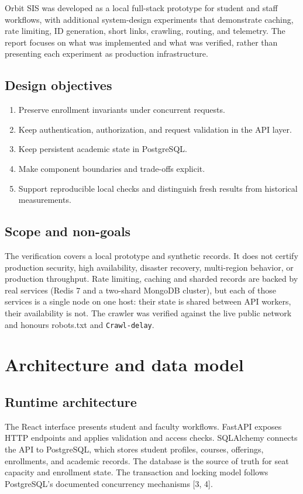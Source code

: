 \documentclass[11pt,a4paper,oneside]{report}
\begin{document}
Orbit SIS was developed as a local full-stack prototype for student and staff workflows, with additional system-design experiments that demonstrate caching, rate limiting, ID generation, short links, crawling, routing, and telemetry. The report focuses on what was implemented and what was verified, rather than presenting each experiment as production infrastructure.

\section{Design objectives}
\begin{enumerate}
\item Preserve enrollment invariants under concurrent requests.
\item Keep authentication, authorization, and request validation in the API layer.
\item Keep persistent academic state in PostgreSQL.
\item Make component boundaries and trade-offs explicit.
\item Support reproducible local checks and distinguish fresh results from historical measurements.
\end{enumerate}

\section{Scope and non-goals}
The verification covers a local prototype and synthetic records. It does not certify production security, high availability, disaster recovery, multi-region behavior, or production throughput. Rate limiting, caching and sharded records are backed by real services (Redis 7 and a two-shard MongoDB cluster), but each of those services is a single node on one host: their state is shared between API workers, their availability is not. The crawler was verified against the live public network and honours robots.txt and \texttt{Crawl-delay}.

\chapter{Architecture and data model}
\section{Runtime architecture}
The React interface presents student and faculty workflows. FastAPI exposes HTTP endpoints and applies validation and access checks. SQLAlchemy connects the API to PostgreSQL, which stores student profiles, courses, offerings, enrollments, and academic records. The database is the source of truth for seat capacity and enrollment state. The transaction and locking model follows PostgreSQL's documented concurrency mechanisms [3, 4].
\end{document}
